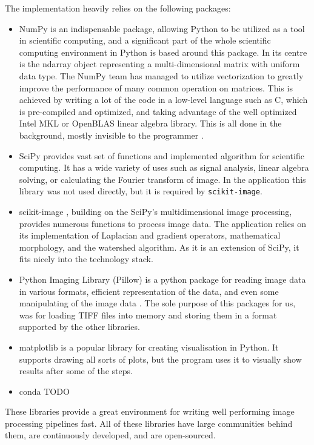 \documentclass[
  digital,     %
  oneside,     %
  nosansbold,  %
  nocolorbold, %
  lof,         %
  lot,         %
]{fithesis4}
\begin{document}
The implementation heavily relies on the following packages:
\begin{itemize}
    \item{NumPy \cite{harris2020array} is an indispensable package, allowing
        Python to be utilized as a tool in scientific computing, and a
        significant part of the whole scientific computing environment in Python
        is based around this package. In its centre is the ndarray object
        representing a multi-dimensional matrix with uniform data type. The
        NumPy team has managed to utilize vectorization to greatly improve the
        performance of many common operation on matrices. This is achieved by
        writing a lot of the code in a low-level language such as C, which is
        pre-compiled and optimized, and taking advantage of the well optimized
        Intel MKL or OpenBLAS linear algebra library. This is all done in the
        background, mostly invisible to the programmer \cite{numpyManual2022}.}
    \item{SciPy \cite{2020SciPy-NMeth} provides vast set of functions and
        implemented algorithm for scientific computing. It has a wide variety of
        uses such as signal analysis, linear algebra solving, or calculating the
        Fourier transform of image. In the application this library was not used
        directly, but it is required by \texttt{scikit-image}.}
    \item{scikit-image \cite{scikit-image}, building on the SciPy's
        multidimensional image processing, provides numerous functions to
        process image data. The application relies on its implementation of
        Laplacian and gradient operators, mathematical morphology, and the watershed
        algorithm. As it is an extension of SciPy, it fits nicely into the
        technology stack.}
    \item{Python Imaging Library (Pillow) is a python package for reading image
        data in various formats, efficient representation of the data, and even
        some manipulating of the image data \cite{clarkc20102023}. The sole
        purpose of this packages for us, was for loading TIFF files into memory
        and storing them in a format supported by the other libraries.}
    \item{matplotlib \cite{hunter2007} is a popular library for creating
        visualisation in Python. It supports drawing all sorts of plots, but the
        program uses it to visually show results after some of the steps.}
    \item{conda TODO}
\end{itemize}
These libraries provide a great environment for writing well performing image
processing pipelines fast. All of these libraries have large communities
behind them, are continuously developed, and are open-sourced.
\end{document}
